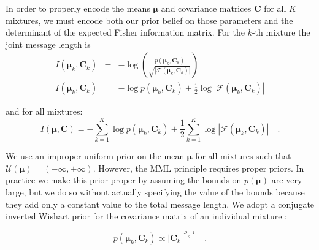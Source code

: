 \documentclass{elsarticle}
\newcommand{\vect}[1]{\boldsymbol{\mathbf{#1}}}
\def\cov{C}
\def\veccov{\vect{\cov}}
\def\vecmean{\vect{\mu}}
\newcommand{\fisher}[1]{\mathcal{F}\left(#1\right)}
\newcommand{\detfisher}[1]{\left|\fisher{#1}\right|}
\newcommand{\prior}[1]{p\left(#1\right)}
\begin{document}
In order to properly encode the means $\vecmean$ and covariance matrices
$\veccov$ for all $K$ mixtures, we must encode both our prior belief on 
those parameters and the determinant of the expected Fisher information 
matrix. For the $k$-th mixture the joint message length is
\begin{eqnarray}
  I(\vecmean_k,\veccov_k) &=& -\log{\left(\frac{\prior{{\vecmean_k,\veccov_k}}}{\sqrt{\detfisher{{\vecmean_k,\veccov_k}}}}\right)} \nonumber \\ 
  I(\vecmean_k,\veccov_k) &=& -\log{\prior{{\vecmean_k,\veccov_k}}} + \frac{1}{2}\log{\detfisher{{\vecmean_k,\veccov_k}}}
\end{eqnarray}

\noindent{}and for all mixtures:
\begin{equation}
  I(\vecmean,\veccov) = -\sum_{k=1}^{K}\log{\prior{{\vecmean_k,\veccov_k}}} + \frac{1}{2}\sum_{k=1}^{K}\log{\detfisher{{\vecmean_k,\veccov_k}}} \quad .
  \label{eq:I_component_params}
\end{equation}

We use an improper uniform prior on the mean $\vecmean$ for all mixtures such
that 
    $\mathcal{U}(\vecmean) = (-\infty, +\infty)$.
However,  the MML principle requires proper priors. In practice we make 
this prior proper by assuming the bounds on $\prior{\vecmean}$ are very large, but 
we do so without actually specifying the value of the bounds because they add 
only a constant value to the total message length.
We adopt a conjugate inverted Wishart prior for the covariance matrix of an
individual mixture \cite[Section 5.2.3 of][]{Knorr-Held:2000}:

\begin{equation}
  \prior{{\vecmean_k, \veccov_k}} \propto |\veccov_k|^{\frac{D+1}{2}} \quad .
  \label{eq:covariance-prior}
\end{equation}
\end{document}
